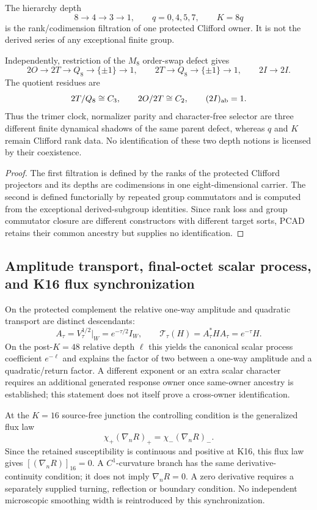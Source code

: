 \documentclass[12pt,a4paper]{article}
\begin{document}
\begin{theorem}
\label{p3e:thm:v188-two-depth-structures}
The hierarchy depth
\[
 8\to4\to3\to1,
 \qquad q=0,4,5,7,
 \qquad K=8q
\]
is the rank/codimension filtration of one protected Clifford owner.  It is
not the derived series of any exceptional finite group.

Independently, restriction of the $M_8$ order-swap defect gives
\[
 2O\to2T\to Q_8\to\{\pm1\}\to1,
 \qquad
 2T\to Q_8\to\{\pm1\}\to1,
 \qquad
 2I\to2I.
\]
The quotient residues are
\[
 2T/Q_8\cong C_3,
 \qquad 2O/2T\cong C_2,
 \qquad (2I)_{\rm ab}=1.
\]
Thus the trimer clock, normalizer parity and character-free selector are
three different finite dynamical shadows of the same parent defect, whereas
$q$ and $K$ remain Clifford rank data.  No identification of these two depth
notions is licensed by their coexistence.
\end{theorem}

\begin{proof}
The first filtration is defined by the ranks of the protected Clifford
projectors and its depths are codimensions in one eight-dimensional carrier.
The second is defined functorially by repeated group commutators and is
computed from the exceptional derived-subgroup identities.  Since rank loss
and group commutator closure are different constructors with different target
sorts, PCAD retains their common ancestry but supplies no identification.
\end{proof}

\subsection{Amplitude transport, final-octet scalar process, and K16 flux synchronization}
\label{p3e:sec:v194-amplitude-flux-sync}

On the protected complement the relative one-way amplitude and quadratic
transport are distinct descendants:
\[
 \boxed{A_\tau=V_\tau^{1/2}|_W=e^{-\tau/2}I_W,}
 \qquad
 \boxed{\mathcal T_\tau(H)=A_\tau^*HA_\tau=e^{-\tau}H.}
\]
On the post-$K=48$ relative depth $\ell$ this yields the canonical scalar
process coefficient $e^{-\ell}$ and explains the factor of two between a
one-way amplitude and a quadratic/return factor.  A different exponent or an
extra scalar character requires an additional generated response owner once
same-owner ancestry is established; this statement does not itself prove a
cross-owner identification.

At the $K=16$ source-free junction the controlling condition is the generalized
flux law
\[
 \boxed{\chi_+(\nabla_nR)_+=\chi_-(\nabla_nR)_-.}
\]
Since the retained susceptibility is continuous and positive at K16, this
flux law gives $[(\nabla_nR)]_{16}=0$. A $C^1$-curvature branch has the
same derivative-continuity condition; it does not imply
$\nabla_nR=0$. A zero derivative requires a separately supplied turning,
reflection or boundary condition. No independent microscopic smoothing width
is reintroduced by this synchronization.
\end{document}
